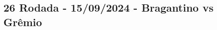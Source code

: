 \newpage
\subsection{26 Rodada - 15/09/2024 - Bragantino vs Grêmio}

\begin{figure}[H]
    \centering
    
\end{figure}